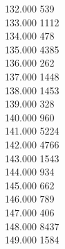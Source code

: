 { 132.000	539 \\
 133.000	1112 \\
 134.000	478 \\
 135.000	4385 \\
 136.000	262 \\
 137.000	1448 \\
 138.000	1453 \\
 139.000	328 \\
 140.000	960 \\
 141.000	5224 \\
 142.000	4766 \\
 143.000	1543 \\
 144.000	934 \\
 145.000	662 \\
 146.000	789 \\
 147.000	406 \\
 148.000	8437 \\
 149.000	1584 \\
}

